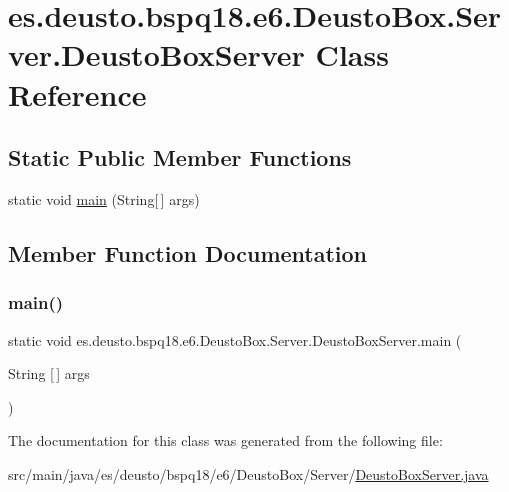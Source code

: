 \hypertarget{classes_1_1deusto_1_1bspq18_1_1e6_1_1_deusto_box_1_1_server_1_1_deusto_box_server}{}\section{es.\+deusto.\+bspq18.\+e6.\+Deusto\+Box.\+Server.\+Deusto\+Box\+Server Class Reference}
\label{classes_1_1deusto_1_1bspq18_1_1e6_1_1_deusto_box_1_1_server_1_1_deusto_box_server}
\subsection*{Static Public Member Functions}
\begin{DoxyCompactItemize}
\item 
static void \mbox{\hyperlink{classes_1_1deusto_1_1bspq18_1_1e6_1_1_deusto_box_1_1_server_1_1_deusto_box_server_ac6685ef386a3553f35ddd3c87c306ab9}{main}} (String\mbox{[}$\,$\mbox{]} args)
\end{DoxyCompactItemize}


\subsection{Member Function Documentation}
\mbox{\label{classes_1_1deusto_1_1bspq18_1_1e6_1_1_deusto_box_1_1_server_1_1_deusto_box_server_ac6685ef386a3553f35ddd3c87c306ab9}} 
\subsubsection{\texorpdfstring{main()}{main()}}
{\footnotesize\ttfamily static void es.\+deusto.\+bspq18.\+e6.\+Deusto\+Box.\+Server.\+Deusto\+Box\+Server.\+main (\begin{DoxyParamCaption}\item[{String \mbox{[}$\,$\mbox{]}}]{args }\end{DoxyParamCaption})\hspace{0.3cm}{\ttfamily [static]}}



The documentation for this class was generated from the following file\+:\begin{DoxyCompactItemize}
\item 
src/main/java/es/deusto/bspq18/e6/\+Deusto\+Box/\+Server/\mbox{\hyperlink{_deusto_box_server_8java}{Deusto\+Box\+Server.\+java}}\end{DoxyCompactItemize}
